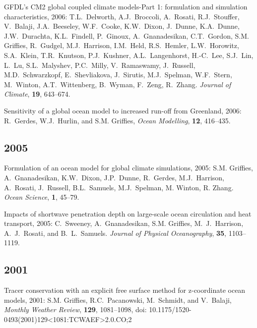 \begin{etaremune}
\item GFDL's CM2 global coupled climate models-Part 1: formulation and  simulation characteristics, 2006: T.L.\ Delworth, A.J.\ Broccoli,  A.\ Rosati, R.J.\ Stouffer, V.\ Balaji, J.A.\ Beeseley, W.F.\ Cooke,  K.W.\ Dixon, J.\ Dunne, K.A.\ Dunne, J.W.\ Durachta, K.L.\ Findell,
  P.\ Ginoux, A.\ Gnanadesikan, C.T.\ Gordon, 
  S.M. Grif\/f\/ies,  R.\ Gudgel, M.J.\ Harrison, I.M.\ Held, R.S.\ Hemler, L.W.\  Horowitz, S.A.\ Klein, T.R.\ Knutson, P.J.\ Kushner, A.L.\  Langenhorst, H.-C.\ Lee, S.J.\ Lin, L.\ Lu, S.L.\ Malyshev, P.C.\
  Milly, V.\ Ramaswamy, J.\ Russell, M.D.\ Schwarzkopf, E.\  Shevliakova, J.\ Sirutis, M.J.\ Spelman, W.F.\ Stern, M.\ Winton,  A.T.\ Wittenberg, B.\ Wyman, F.\ Zeng, R.\ Zhang.  {\em Journal of  Climate}, {\bf 19}, 643--674.

\item Sensitivity of a global ocean model to increased run-off from Greenland, 2006: R.\ Gerdes, W.J.\ Hurlin, and S.M. Grif\/f\/ies, {\em Ocean Modelling}, {\bf 12}, 416--435.
  
\subsection*{\sc \color{Maroon} 2005}
  
\item Formulation of an ocean model for global climate simulations, 2005: S.M. Grif\/f\/ies, A.\ Gnanadesikan, K.W.\ Dixon, J.P.\ Dunne, R.\ Gerdes, M.J.\ Harrison, A.\ Rosati, J.\ Russell, B.L.\ Samuels, M.J.\ Spelman, M. Winton, R. Zhang. {\em Ocean Science}, {\bf
1}, 45--79.

\item Impacts of shortwave penetration depth on large-scale ocean circulation and heat transport, 2005: C.\ Sweeney, A.\ Gnanadesikan, S.M. Grif\/f\/ies, M.\ J.\ Harrison, A.\ J.\ Rosati, and B.\ L.\ Samuels.  {\em Journal of Physical Oceanography}, {\bf 35},
1103--1119.

\subsection*{\sc \color{Maroon} 2001}

\item Tracer conservation with an explicit free surface method for z-coordinate ocean models, 2001: 
  S.M. Grif\/f\/ies, R.C.\  Pacanowski, M.\ Schmidt, and V.\ Balaji, {\em Monthly Weather  Review}, {\bf 129}, 1081--1098, doi: 10.1175/1520-0493(2001)129<1081:TCWAEF>2.0.CO;2


\end{etaremune}
